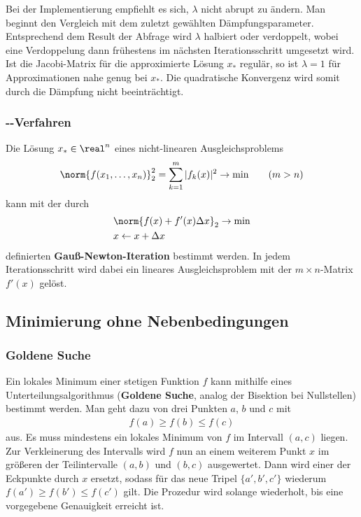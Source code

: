 Bei der Implementierung empfiehlt es sich, $\lambda$ nicht abrupt zu ändern.
Man beginnt den Vergleich mit dem zuletzt gewählten Dämpfungsparameter.
Entsprechend dem Result der Abfrage wird $\lambda$ halbiert oder verdoppelt,
wobei eine Verdoppelung dann frühestens im nächsten Iterationsschritt
umgesetzt wird.
Ist die Jacobi-Matrix für die approximierte Lösung $x_\ast$ regulär,
so ist $\lambda = 1$ für Approximationen nahe genug bei $x_\ast$.
Die quadratische Konvergenz wird somit durch die Dämpfung nicht
beeinträchtigt.

\pagebreak

\subsubsection{%
    --Verfahren%
}

Die Lösung $x_\ast \in \real^n$ eines nicht-linearen Ausgleichsproblems
\begin{align*}
    \norm{f(x_1, \dotsc, x_n)}_2^2
    = \sum_{k=1}^m |f_k(x)|^2 \rightarrow \min
    \qquad (m > n)
\end{align*}
kann mit der durch
\begin{align*}
    & \norm{f(x) + f'(x) \Delta x}_2 \rightarrow \min \\
    & x \leftarrow x + \Delta x
\end{align*}
definierten \textbf{Gauß-Newton-Iteration} bestimmt werden.
In jedem Iterationsschritt wird dabei ein lineares Ausgleichsproblem mit der
$m \times n$-Matrix $f'(x)$ gelöst.

\pagebreak

\subsection{%
    Minimierung ohne Nebenbedingungen%
}

\subsubsection{%
    Goldene Suche%
}

Ein lokales Minimum einer stetigen Funktion $f$ kann mithilfe eines
Unterteilungsalgorithmus
(\textbf{Goldene Suche}, analog der Bisektion bei Nullstellen) bestimmt werden.
Man geht dazu von drei Punkten $a$, $b$ und $c$ mit
\begin{align*}
    f(a) \ge f(b) \le f(c)
\end{align*}
aus.
Es muss mindestens ein lokales Minimum von $f$ im Intervall $(a, c)$ liegen.
Zur Verkleinerung des Intervalls wird $f$ nun an einem weiterem Punkt $x$ im
größeren der Teilintervalle $(a, b)$ und $(b, c)$ ausgewertet.
Dann wird einer der Eckpunkte durch $x$ ersetzt, sodass für das neue Tripel
$\{a', b', c'\}$ wiederum $f(a') \ge f(b') \le f(c')$ gilt.
Die Prozedur wird solange wiederholt, bis eine vorgegebene Genauigkeit erreicht
ist.


